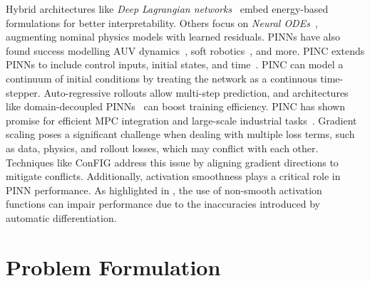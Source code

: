 Hybrid architectures like \textit{Deep Lagrangian networks}~\cite{lutter_combining_2023} embed energy-based formulations for better interpretability. Others focus on \textit{Neural ODEs}~\cite{ma_development_2024, chen2018neural}, augmenting nominal physics models with learned residuals. PINNs have also found success modelling AUV dynamics~\cite{zhao_research_2024}, soft robotics~\cite{gao_sim--real_2024}, and more. PINC extends PINNs to include control inputs, initial states, and time~\cite{antonelo_physics-informed_2024}. PINC can model a continuum of initial conditions by treating the network as a continuous time-stepper. Auto-regressive rollouts allow multi-step prediction, and architectures like domain-decoupled PINNs~\cite{krauss_domain-decoupled_2024} can boost training efficiency. PINC has shown promise for efficient MPC integration and large-scale industrial tasks~\cite{kittelsen_physics-informed_2024}. Gradient scaling poses a significant challenge when dealing with multiple loss terms, such as data, physics, and rollout losses, which may conflict with each other. Techniques like ConFIG \cite{liu_config_2024} address this issue by aligning gradient directions to mitigate conflicts. Additionally, activation smoothness plays a critical role in PINN performance. As highlighted in \cite{nicodemus_physics-informed_2022}, the use of non-smooth activation functions can impair performance due to the inaccuracies introduced by automatic differentiation.



\section{Problem Formulation} %
\label{sec:problem}

